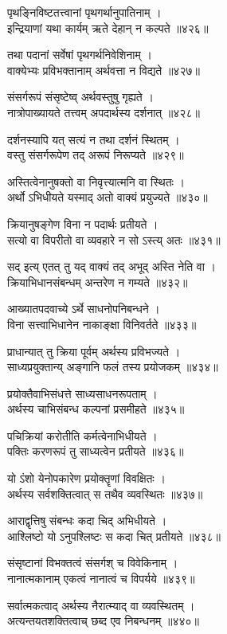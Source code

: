 पृथङ्निविष्टतत्त्वानां पृथगर्थानुपातिनाम् ।\\इन्द्रियाणां यथा कार्यम् ऋते देहान् न कल्पते ॥४२६॥

तथा पदानां सर्वेषां पृथगर्थनिवेशिनाम् ।\\वाक्येभ्यः प्रविभक्तानाम् अर्थवत्ता न विद्यते ॥४२७॥

संसर्गरूपं संसृष्टेष्व् अर्थवस्तुषु गृह्यते ।\\नात्रोपाख्यायते तत्त्वम् अपदार्थस्य दर्शनात् ॥४२८॥

दर्शनस्यापि यत् सत्यं न तथा दर्शनं स्थितम् ।\\वस्तु संसर्गरूपेण तद् अरूपं निरूप्यते ॥४२९॥

अस्तित्वेनानुषक्तो वा निवृत्त्यात्मनि वा स्थितः ।\\अर्थो ऽभिधीयते यस्माद् अतो वाक्यं प्रयुज्यते ॥४३०॥

क्रियानुषङ्गेण विना न पदार्थः प्रतीयते ।\\सत्यो वा विपरीतो वा व्यवहारे न सो ऽस्त्य् अतः ॥४३१॥

सद् इत्य् एतत् तु यद् वाक्यं तद् अभूद् अस्ति नेति वा ।\\क्रियाभिधानसंबन्धम् अन्तरेण न गम्यते ॥४३२॥

आख्यातपदवाच्ये ऽर्थे साधनोपनिबन्धने ।\\विना सत्त्वाभिधानेन नाकाङ्क्षा विनिवर्तते ॥४३३॥

प्राधान्यात् तु क्रिया पूर्वम् अर्थस्य प्रविभज्यते ।\\साध्यप्रयुक्तान्य् अङ्गानि फलं तस्य प्रयोजकम् ॥४३४॥

प्रयोक्तैवाभिसंधत्ते साध्यसाधनरूपताम् ।\\अर्थस्य चाभिसंबन्ध कल्पनां प्रसमीहते ॥४३५॥

पचिक्रियां करोतीति कर्मत्वेनाभिधीयते ।\\पक्तिः करणरूपं तु साध्यत्वेन प्रतीयते ॥४३६॥

यो ऽंशो येनोपकारेण प्रयोक्तॄणां विवक्षितः ।\\अर्थस्य सर्वशक्तित्वात् स तथैव व्यवस्थितः ॥४३७॥

आराद्वृत्तिषु संबन्धः कदा चिद् अभिधीयते ।\\आश्लिष्टो यो ऽनुपश्लिष्टः स कदा चित् प्रतीयते ॥४३८॥

संसृष्टानां विभक्तत्वं संसर्गश् च विवेकिनाम् ।\\नानात्मकानाम् एकत्वं नानात्वं च विपर्यये ॥४३९॥

सर्वात्मकत्वाद् अर्थस्य नैरात्म्याद् वा व्यवस्थितम् ।\\अत्यन्तयतशक्तित्वाच् छब्द एव निबन्धनम् ॥४४०॥

